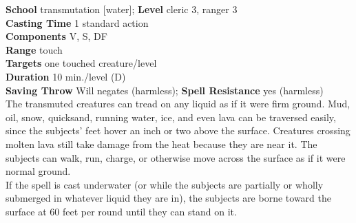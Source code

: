 \textbf{School} transmutation [water]; \textbf{Level} cleric 3, ranger 3\\
\textbf{Casting Time} 1 standard action\\
\textbf{Components} V, S, DF\\
\textbf{Range} touch\\
\textbf{Targets} one touched creature/level\\
\textbf{Duration} 10 min./level (D)\\
\textbf{Saving Throw }Will negates (harmless); \textbf{Spell Resistance} yes (harmless)\\
The transmuted creatures can tread on any liquid as if it were firm ground. Mud, oil, snow, quicksand, running water, ice, and even lava can be traversed easily, since the subjects' feet hover an inch or two above the surface. Creatures crossing molten lava still take damage from the heat because they are near it. The subjects can walk, run, charge, or otherwise move across the surface as if it were normal ground.\\
If the spell is cast underwater (or while the subjects are partially or wholly submerged in whatever liquid they are in), the subjects are borne toward the surface at 60 feet per round until they can stand on it.\\
